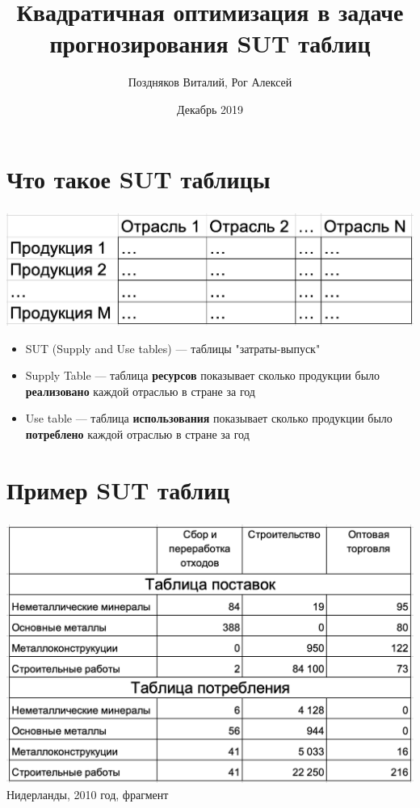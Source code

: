 \documentclass{beamer}
\title{Квадратичная оптимизация в задаче прогнозирования SUT таблиц}
\author{Поздняков Виталий,  Рог Алексей}
\date{Декабрь 2019}
\begin{document}
\begin{frame}
\titlepage
\end{frame}

\section{Что такое SUT таблицы}

\begin{frame}
	\frametitle{\insertsection}
	
	\includegraphics[width=\textwidth]{2019-12-07_12-18-36.png}
	
	\begin{itemize}
    \item SUT (Supply and Use tables) — таблицы "затраты-выпуск"
    \item Supply Table — таблица \textbf{ресурсов} показывает сколько продукции было \textbf{реализовано} каждой отраслью в стране за год
    \item Use table — таблица \textbf{использования} показывает сколько продукции было \textbf{потреблено} каждой отраслью в стране за год
    \end{itemize}
    
\end{frame}

\section{Пример SUT таблиц}
\begin{frame}
	\frametitle{\insertsection}
	
     \includegraphics[width=\textwidth]{2019-12-04_20-57-19.png}
     Нидерланды, 2010 год, фрагмент

\end{frame}
\end{document}
